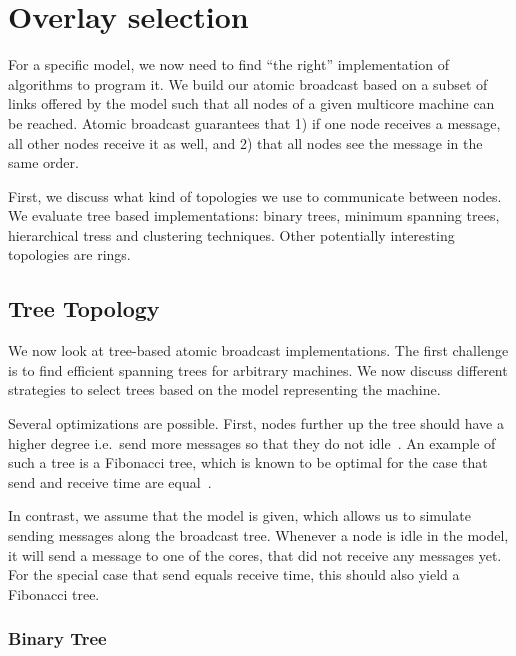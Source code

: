 \documentclass{article}
\begin{document}
\section{Overlay selection}
\label{sec:overlay}

For a specific model, we now need to find ``the right'' implementation
of algorithms to program it. We build our atomic broadcast based on a
subset of links offered by the model such that all nodes of a given
multicore machine can be reached. Atomic broadcast guarantees that 1)
if one node receives a message, all other nodes receive it as well,
and 2) that all nodes see the message in the same order.

First, we discuss what kind of topologies we use to communicate
between nodes. We evaluate tree based implementations: binary trees,
minimum spanning trees, hierarchical tress and clustering
techniques. Other potentially interesting topologies are rings.

\subsection{Tree Topology}

We now look at tree-based atomic broadcast implementations. The first
challenge is to find efficient spanning trees for arbitrary
machines. We now discuss different strategies to select trees based on
the model representing the machine.

Several optimizations are possible. First, nodes further up the tree
should have a higher degree i.e.\ send more messages so that they do
not idle~\cite{Bar-Noy1994}. An example of such a tree is a Fibonacci
tree, which is known to be optimal for the case that send and receive
time are equal~\cite{Bar-Noy1994}. 

In contrast, we assume that the model is given, which allows us to
simulate sending messages along the broadcast tree. Whenever a node is
idle in the model, it will send a message to one of the cores, that
did not receive any messages yet. For the special case that send
equals receive time, this should also yield a Fibonacci tree.

\subsubsection{Binary Tree}
\end{document}
